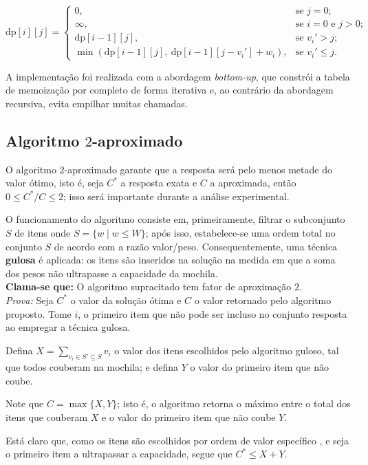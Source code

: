 \documentclass[12pt]{article}
\begin{document}
\[
\text{dp}[i][j] = 
\begin{cases}
0, & \text{se } j = 0;\\
\infty, & \text{se } i = 0 \text{ e } j > 0;\\
\text{dp}[i-1][j], & \text{se } v_i' > j;\\
\min\left(\text{dp}[i-1][j],\ \text{dp}[i-1][j - v_i'] + w_i\right), & \text{se } v_i' \leq j.
\end{cases}
\]

A implementação foi realizada com a abordagem \textit{bottom-up}, que constrói a tabela de memoização por completo de forma iterativa e, ao contrário da abordagem recursiva, evita empilhar muitas chamadas.


\subsection{Algoritmo \(2\)-aproximado}

O algoritmo \(2\)-aproximado garante que a resposta será pelo menos metade do valor ótimo, isto é, seja \(C^*\) a resposta exata e \(C\) a aproximada, então \(0 \leq C^*/C \leq 2\); isso será importante durante a análise experimental.

O funcionamento do algoritmo consiste em, primeiramente, filtrar o subconjunto \(S\) de itens onde \(S = \{w \mid w \leq W\}\); após isso, estabelece-se uma ordem total no conjunto \(S\) de acordo com a razão valor/peso. Consequentemente, uma técnica \textbf{gulosa} é aplicada: os itens são inseridos na solução na medida em que a soma dos pesos não ultrapasse a capacidade da mochila.\\
\textbf{Clama-se que:} O algoritmo supracitado tem fator de aproximação \(2\).\\
\textit{Prova:} Seja \(C^*\) o valor da solução ótima e \(C\) o valor retornado pelo algoritmo proposto. Tome \(i\), o primeiro item que não pode ser incluso no conjunto resposta ao empregar a técnica gulosa.

Defina \(X = \sum_{v_i \in S' \subseteq S}v_i\) o valor dos itens escolhidos pelo algoritmo guloso, tal que todos couberam na mochila; e defina \(Y\) o valor do primeiro item que não coube.

Note que \(C = \max\{X,Y\}\); isto é, o algoritmo retorna o máximo entre o total dos itens que couberam \(X\) e o valor do primeiro item que não coube \(Y\).

Está claro que, como os itens são escolhidos por ordem de valor específico \cite{aprox}, e seja o primeiro item a ultrapassar a capacidade, segue que \(C^* \leq X+Y\). 
\end{document}
